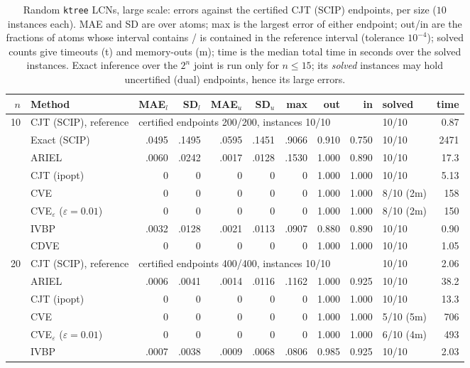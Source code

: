 \begin{table}[htbp]
\centering
\scriptsize
\caption{Random \texttt{ktree} LCNs, large scale: errors against the certified CJT (SCIP) endpoints, per size ($10$ instances each). MAE and SD are over atoms; max is the largest error of either endpoint; out/in are the fractions of atoms whose interval contains / is contained in the reference interval (tolerance $10^{-4}$); solved counts give timeouts (t) and memory-outs (m); time is the median total time in seconds over the solved instances. Exact inference over the $2^n$ joint is run only for $n \le 15$; its \emph{solved} instances may hold uncertified (dual) endpoints, hence its large errors.}
\label{tab:full-ktree-large}
\begin{tabular}{rlrrrrrrrlr}
\toprule
$n$ & Method & MAE$_l$ & SD$_l$ & MAE$_u$ & SD$_u$ & max & out & in & solved & time \\
\midrule
10 & CJT (SCIP), reference & \multicolumn{7}{l}{certified endpoints 200/200, instances 10/10} & 10/10 & 0.87 \\
 & Exact (SCIP) & .0495 & .1495 & .0595 & .1451 & .9066 & 0.910 & 0.750 & 10/10 & 2471 \\
 & ARIEL & .0060 & .0242 & .0017 & .0128 & .1530 & 1.000 & 0.890 & 10/10 & 17.3 \\
 & CJT (ipopt) & 0 & 0 & 0 & 0 & 0 & 1.000 & 1.000 & 10/10 & 5.13 \\
 & CVE & 0 & 0 & 0 & 0 & 0 & 1.000 & 1.000 & 8/10 (2m) & 158 \\
 & CVE$_\varepsilon$ ($\varepsilon{=}0.01$) & 0 & 0 & 0 & 0 & 0 & 1.000 & 1.000 & 8/10 (2m) & 150 \\
 & IVBP & .0032 & .0128 & .0021 & .0113 & .0907 & 0.880 & 0.890 & 10/10 & 0.90 \\
 & CDVE & 0 & 0 & 0 & 0 & 0 & 1.000 & 1.000 & 10/10 & 1.05 \\
\midrule
20 & CJT (SCIP), reference & \multicolumn{7}{l}{certified endpoints 400/400, instances 10/10} & 10/10 & 2.06 \\
 & ARIEL & .0006 & .0041 & .0014 & .0116 & .1162 & 1.000 & 0.925 & 10/10 & 38.2 \\
 & CJT (ipopt) & 0 & 0 & 0 & 0 & 0 & 1.000 & 1.000 & 10/10 & 13.3 \\
 & CVE & 0 & 0 & 0 & 0 & 0 & 1.000 & 1.000 & 5/10 (5m) & 706 \\
 & CVE$_\varepsilon$ ($\varepsilon{=}0.01$) & 0 & 0 & 0 & 0 & 0 & 1.000 & 1.000 & 6/10 (4m) & 493 \\
 & IVBP & .0007 & .0038 & .0009 & .0068 & .0806 & 0.985 & 0.925 & 10/10 & 2.03 \\

\end{tabular}
\end{table}
